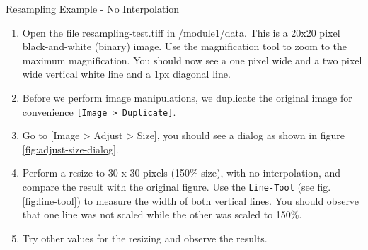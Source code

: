 \begin{taskbox}{Resampling Example - No Interpolation}

\begin{enumerate}
	\item Open the file resampling-test.tiff in /module1/data. This is a 20x20 pixel black-and-white (binary) image. Use the magnification tool to zoom to the maximum magnification. You should now see a one pixel wide and a two pixel wide vertical white line and a 1px diagonal line. 
	\item Before we perform image manipulations, we duplicate the original image for convenience \texttt{[Image > Duplicate]}.
	\item Go to [Image > Adjust > Size], you should see a dialog as shown in figure \ref{fig:adjust-size-dialog}.
	
	\begin{minipage}[t]{\linewidth}
		\begin{center}
		\medskip
		\label{fig:adjust-size-dialog}
		\end{center}
	\end{minipage}
	
	\item Perform a resize to 30 x 30 pixels (150\% size), with no interpolation, and compare the result with the original figure. Use the \texttt{Line-Tool} (see fig. \ref{fig:line-tool}) to measure the width of both vertical lines. You should observe that one line was not scaled while the other was scaled to 150\%.
	
	\begin{minipage}[t]{\linewidth}
		\begin{center}
		\medskip
		\label{fig:line-tool}
		\end{center}
	\end{minipage}
	
	\item Try other values for the resizing and observe the results.
\end{enumerate}

\end{taskbox}

